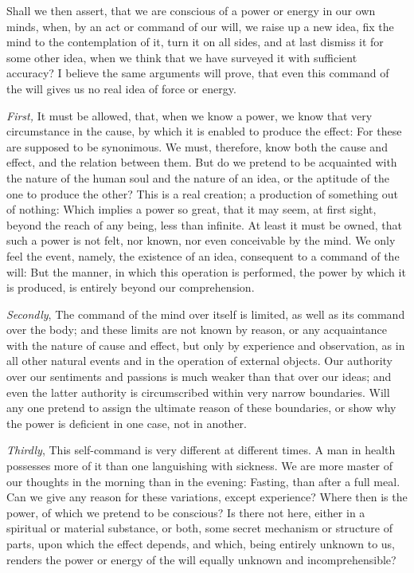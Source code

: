 \documentclass[]{article}
\begin{document}
\begin{sectionbody}
\humeparagraph  Shall we then assert, that we are conscious of a power or energy in our own minds, when, by an act or command of our will, we raise up a new idea, fix the mind to the contemplation of it, turn it on all sides, and at last dismiss it for some other idea, when we think that we have surveyed it with sufficient accuracy? I believe the same arguments will prove, that even this command of the will gives us no real idea of force or energy.

\humeparagraph  \emph{First,} It must be allowed, that, when we know a power, we know that very circumstance in the cause, by which it is enabled to produce the effect: For these are supposed to be synonimous. We must, therefore, know both the cause and effect, and the relation between them. But do we pretend to be acquainted with the nature of the human soul and the nature of an idea, or the aptitude of the one to produce the other? This is a real creation; a production of something out of nothing: Which implies a power so great, that it may seem, at first sight, beyond the reach of any being, less than infinite. At least it must be owned, that such a power is not felt, nor known, nor even conceivable by the mind. We only feel the event, namely, the existence of an idea, consequent to a command of the will: But the manner, in which this operation is performed, the power by which it is produced, is entirely beyond our comprehension.

\humeparagraph  \emph{Secondly}, The command of the mind over itself is limited, as well as its command over the body; and these limits are not known by reason, or any acquaintance with the nature of cause and effect, but only by experience and observation, as in all other natural events and in the operation of external objects. Our authority over our sentiments and passions is much weaker than that over our ideas; and even the latter authority is circumscribed within very narrow boundaries. Will any one pretend to assign the ultimate reason of these boundaries, or show why the power is deficient in one case, not in another.

\humeparagraph  \emph{Thirdly}, This self-command is very different at different times. A man in health possesses more of it than one languishing with sickness. We are more master of our thoughts in the morning than in the evening: Fasting, than after a full meal. Can we give any reason for these variations, except experience? Where then is the power, of which we pretend to be conscious? Is there not here, either in a spiritual or material substance, or both, some secret mechanism or structure of parts, upon which the effect depends, and which, being entirely unknown to us, renders the power or energy of the will equally unknown and incomprehensible?


\end{sectionbody}
\end{document}
